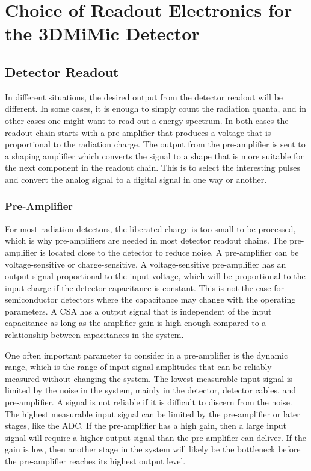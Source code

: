 \documentclass[../main/thesis.tex]{subfiles}
\begin{document}
\newpage

\chapter{Choice of Readout Electronics for the 3DMiMic Detector}
\label{e}

\section{Detector Readout}
\label{t-read}
In different situations, the desired output from the detector readout will be different. In some cases, it is enough to simply count the radiation quanta, and in other cases one might want to read out a energy spectrum. In both cases the readout chain starts with a pre-amplifier that produces a voltage that is proportional to the radiation charge. The output from the pre-amplifier is sent to a shaping amplifier which converts the signal to a shape that is more suitable for the next component in the readout chain. This is to select the interesting pulses and convert the analog signal to a digital signal in one way or another. \citep[chap. 16]{Knoll}

\subsection{Pre-Amplifier}
\label{t-amp}
For most radiation detectors, the liberated charge is too small to be processed, which is why pre-amplifiers are needed in most detector readout chains. The pre-amplifier is located close to the detector to reduce noise. A pre-amplifier can be voltage-sensitive or charge-sensitive. A voltage-sensitive pre-amplifier has an output signal proportional to the input voltage, which will be proportional to the input charge if the detector capacitance is constant. This is not the case for semiconductor detectors where the capacitance may change with the operating parameters. A \gls{CSA} has a output signal that is independent of the input capacitance as long as the amplifier gain is high enough compared to a relationship between capacitances in the system. \citep[chap. 16]{Knoll}

One often important parameter to consider in a pre-amplifier is the dynamic range, which is the range of input signal amplitudes that can be reliably measured without changing the system. The lowest measurable input signal is limited by the noise in the system, mainly in the detector, detector cables, and pre-amplifier. A signal is not reliable if it is difficult to discern from the noise. The highest measurable input signal can be limited by the pre-amplifier or later stages, like the \gls{ADC}. If the pre-amplifier has a high gain, then a large input signal will require a higher output signal than the pre-amplifier can deliver. If the gain is low, then another stage in the system will likely be the bottleneck before the pre-amplifier reaches its highest output level. \citep{dynamic-range}
\end{document}
